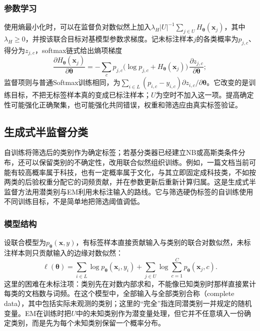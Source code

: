 \subsubsection{参数学习}
使用熵最小化时，可以在监督负对数似然上加入$\lambda_H|U|^{-1}\sum_{j\in U}H_{\bm\theta}(\bm x_j)$，其中$\lambda_H\geq0$，并按该联合目标对基模型参数求梯度。记未标注样本$j$的各类概率为$p_{j,c}$、得分为$z_{j,c}$，softmax链式给出熵项梯度
\[
  \frac{\partial H_{\bm\theta}(\bm x_j)}{\partial\bm\theta}
    =-\sum_{c}p_{j,c}\bigl(\log p_{j,c}+H_{\bm\theta}(\bm x_j)\bigr)
      \,\frac{\partial z_{j,c}}{\partial\bm\theta};
\]
监督项则与普通Softmax训练相同，为$\sum_{i\in L}(p_{i,c}-y_{i,c})\partial z_{i,c}/\partial\bm\theta$。它改变的是训练目标，不把无标签样本真的变成已标注样本；$U$为空时不加入这一项。提高确定性可能强化正确聚集，也可能强化共同错误，权重和筛选应由真实标签验证。

\subsection{生成式半监督分类}
\label{sec:classification-generative-em}
\label{sec:classification-self-training-soft-em}

自训练将筛选后的类别作为确定标签；若基分类器已经建立NB或高斯类条件分布，还可以保留类别的不确定性，改用联合似然组织训练。例如，一篇文档当前可能有较高概率属于科技，也有一定概率属于文化，与其立即固定成科技类，不如按两类的后验权重分配它的词频贡献，并在参数更新后重新计算归属。这是生成式半监督方法用潜类别与EM利用未标注输入的路线。它与筛选硬伪标签的自训练使用不同训练目标，不是简单地把筛选阈值调低。

\subsubsection{模型结构}
设联合模型为$p_{\bm{\theta}}(\bm{x},y)$，有标签样本直接贡献输入与类别的联合对数似然，未标注样本则只贡献输入的边缘对数似然：
\[
  \ell(\bm{\theta})
  =\sum_{i\in L}\log p_{\bm{\theta}}(\bm{x}_i,y_i)
   +\sum_{j\in U}\log\sum_{c=1}^{C}
      p_{\bm{\theta}}(\bm{x}_j,c).
\]
这里的困难在未标注项：类别先在对数内部求和，不能像已知类别时那样直接累计每类的文档数与词频。在这个模型中，全部输入与全部类别合称（complete data），其中包括实际未观测的类别；这里的“完全”指连同潜类别一并规定的随机变量。EM在训练时把$U$中的未知类别作为潜变量处理，但它并不任意填入一份确定类别，而是先为每个未知类别保留一个概率分布。

